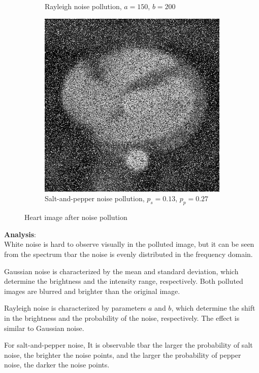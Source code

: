 \documentclass[UTF8]{ctexart}
\begin{document}
\begin{figure}[htbp]
\begin{subfigure}{0.3\textwidth}
        \caption{Rayleigh noise pollution, $a=150$, $b=200$}
    \end{subfigure}%
    \hfill
    \begin{subfigure}{0.3\textwidth}
        \centering
        \includegraphics[width=\linewidth]{heart_noised_s_p.png}
        \caption{Salt-and-pepper noise pollution, $p_s=0.13$, $p_p=0.27$}
    \end{subfigure}
    \caption{Heart image after noise pollution}
    \label{fig:heart}
\end{figure}
\textbf{Analysis}:\\
White noise is hard to observe visually in the polluted image, but it can be seen from the spectrum tbar the noise is evenly distributed in the frequency domain. 

Gaussian noise is characterized by the mean and standard deviation, which determine the brightness and the intensity range, respectively. Both polluted images 
are blurred and brighter than the original image.

Rayleigh noise is characterized by parameters $a$ and $b$, which determine the shift in the brightness and the probability of the noise, respectively. The effect is similar to Gaussian noise.

For salt-and-pepper noise, It is observable tbar the larger the probability of salt noise, the brighter the noise points, and the larger the probability of pepper noise, the darker the noise points.
\end{document}
